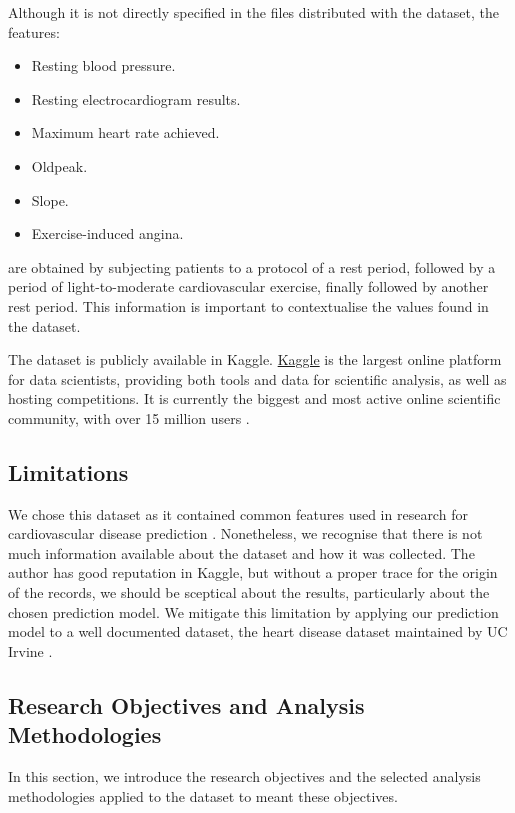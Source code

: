 Although it is not directly specified in the files distributed with the dataset, the features:

\begin{itemize}
    \item Resting blood pressure.
    \item Resting electrocardiogram results.
    \item Maximum heart rate achieved.
    \item Oldpeak.
    \item Slope.
    \item Exercise-induced angina.
\end{itemize}

are obtained by subjecting patients to a protocol of a rest period, followed by a period of light-to-moderate
cardiovascular exercise, finally followed by another rest period. This information is important to contextualise
the values found in the dataset.

The dataset is publicly available in Kaggle. \href{https://www.kaggle.com/}{Kaggle} is the largest online platform for data scientists, providing both
tools and data for scientific analysis, as well as hosting competitions. It is currently the biggest and
most active online scientific community, with over 15 million users \cite{Kaggle}.

\subsection{Limitations}

We chose this dataset as it contained common features used in research for cardiovascular disease prediction \cite{STSegmentChanges}
\cite{STSlopePredictor} \cite{STSlopePredictorComparison}. Nonetheless, we recognise that there is not much information available
about the dataset and how it was collected. The author has good reputation in Kaggle, but without a proper trace for the origin of
the records, we should be sceptical about the results, particularly about the chosen prediction model.
We mitigate this limitation by applying our prediction model to a well documented dataset, the heart disease dataset maintained by
UC Irvine \cite{HeartDiseaseDataset}.

\subsection{Research Objectives and Analysis Methodologies}

In this section, we introduce the research objectives and the selected analysis methodologies applied to the dataset
to meant these objectives.

